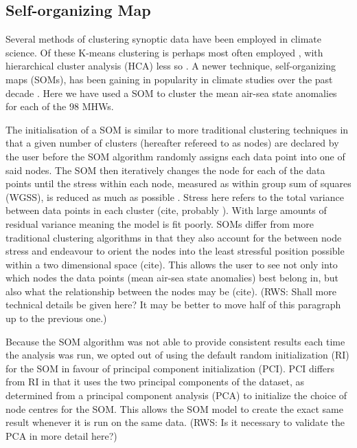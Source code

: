 \documentclass[a4paper,10pt,review]{elsarticle}
\begin{document}
\subsection{Self-organizing Map}
Several methods of clustering synoptic data have been employed in climate science. Of these K-means clustering is perhaps most often employed \citep[e.g.][]{Corte-Real1998, Burrough2001, Kumar2011}, with hierarchical cluster analysis (HCA) less so \citep[e.g.][]{Unal2003}. A newer technique, self-organizing maps (SOMs), has been gaining in popularity in climate studies over the past decade \citep[e.g.][]{Cavazos2000, Hewitson2002, Morioka2010}. Here we have used a SOM to cluster the mean air-sea state anomalies for each of the 98 MHWs.

The initialisation of a SOM is similar to more traditional clustering techniques in that a given number of clusters (hereafter refereed to as nodes) are declared by the user before the SOM algorithm randomly assigns each data point into one of said nodes. The SOM then iteratively changes the node for each of the data points until the stress within each node, measured as within group sum of squares (WGSS), is reduced as much as possible \citep{Jain2010}. Stress here refers to the total variance between data points in each cluster (cite, probably \citep{Jain2010}). With large amounts of residual variance meaning the model is fit poorly. SOMs differ from more traditional clustering algorithms in that they also account for the between node stress and endeavour to orient the nodes into the least stressful position possible within a two dimensional space (cite). This allows the user to see not only into which nodes the data points (mean air-sea state anomalies) best belong in, but also what the relationship between the nodes may be (cite). (RWS: Shall more technical details be given here? It may be better to move half of this paragraph up to the previous one.)

Because the SOM algorithm was not able to provide consistent results each time the analysis was run, we opted out of using the default random initialization (RI) for the SOM in favour of principal component initialization (PCI). PCI differs from RI in that it uses the two principal components of the dataset, as determined from a principal component analysis (PCA) to initialize the choice of node centres for the SOM. This allows the SOM model to create the exact same result whenever it is run on the same data. (RWS: Is it necessary to validate the PCA in more detail here?)
\end{document}
